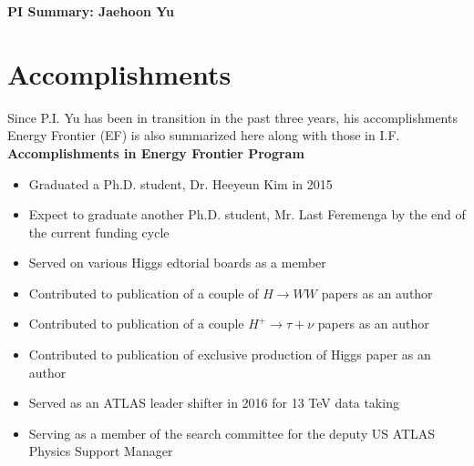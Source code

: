 \begin{center}
\LARGE\textbf{PI Summary: Jaehoon Yu}
\end{center}

\section*{\textbf{Accomplishments}}
Since P.I. Yu has been in transition in the past three years, his accomplishments Energy Frontier (EF) is also summarized here along with those in I.F. 
\noindent\textbf{}
\noindent\textbf{Accomplishments in Energy Frontier Program}
\begin{itemize}[noitemsep,nolistsep]
\item{Graduated a Ph.D. student, Dr. Heeyeun Kim in 2015}
\item{Expect to graduate another Ph.D. student, Mr. Last Feremenga by the end of the current funding cycle}
\item{Served on various Higgs edtorial boards as a member}
\item{Contributed to publication of a couple of $H\rightarrow WW$ papers as an author}
\item{Contributed to publication of a couple $H^{+}\rightarrow \tau+\nu$ papers as an author}
\item{Contributed to publication of exclusive production of Higgs paper as an author}
\item{Served as an ATLAS leader shifter in 2016 for 13 TeV data taking}
\item{Serving as a member of the search committee for the deputy US ATLAS Physics Support Manager}
\end{itemize}

